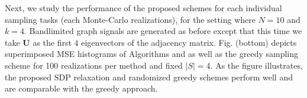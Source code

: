 Next, we study the performance of the proposed schemes for each individual sampling tasks (each Monte-Carlo realizations),  for the setting where $N=10$ and $k=4$. 
Bandlimited graph signals are generated as before except that this time we take $\mathbf{U}$ as the first $4$ eigenvectors of the adjacency matrix. Fig.  (bottom) depicts superimposed MSE histograms of Algorithms  and  as well as the greedy sampling scheme \cite{chamon2017greedy} for 100 realizations per method and fixed $|S|=4$. As the figure illustrates, the proposed SDP relaxation and randomized greedy schemes perform well and are comparable with the greedy approach.

